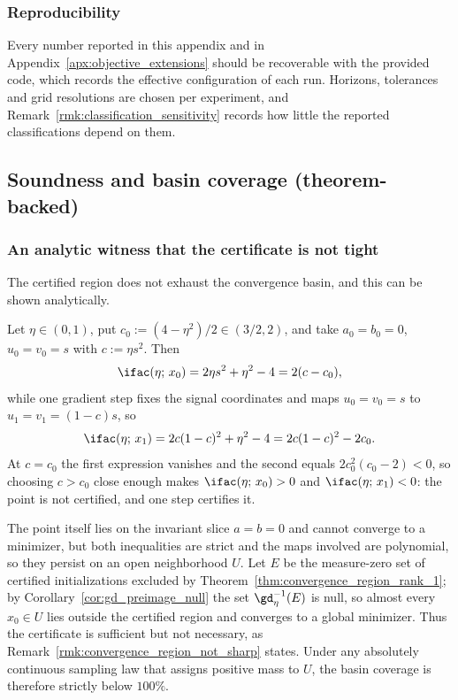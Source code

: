 \documentclass{article}
\begin{document}
\subsubsection{Reproducibility}
\label{apx:sensitivity}

Every number reported in this appendix and in
Appendix~\ref{apx:objective_extensions} should be recoverable with the
provided code, which records the effective configuration of each run.
Horizons, tolerances and grid resolutions are chosen per experiment, and
Remark~\ref{rmk:classification_sensitivity} records how little the reported
classifications depend on them.

\subsection{Soundness and basin coverage (theorem-backed)}
\label{apx:ifac_tightness}

\subsubsection{An analytic witness that the certificate is not tight}
\label{apx:nonsharpness_witness}

The certified region does not exhaust the convergence basin, and this can be
shown analytically.

Let $\eta\in(0,1)$, put $c_0:=(4-\eta^2)/2\in(3/2,2)$, and take $a_0=b_0=0$,
$u_0=v_0=s$ with $c:=\eta s^2$. Then
\begin{align}
    \ifac(\eta;\,x_0) = 2\eta s^2+\eta^2-4 = 2(c-c_0),
\end{align}
while one gradient step fixes the signal coordinates and maps $u_0=v_0=s$ to
$u_1=v_1=(1-c)s$, so
\begin{align}
    \ifac(\eta;\,x_1) = 2c(1-c)^2+\eta^2-4 = 2c(1-c)^2-2c_0 .
\end{align}
At $c=c_0$ the first expression vanishes and the second equals
$2c_0^2(c_0-2)<0$, so choosing $c>c_0$ close enough makes
$\ifac(\eta;\,x_0)>0$ and $\ifac(\eta;\,x_1)<0$: the point is not certified,
and one step certifies it.

The point itself lies on the invariant slice $a=b=0$ and cannot converge to a
minimizer, but both inequalities are strict and the maps involved are
polynomial, so they persist on an open neighborhood $U$. Let $E$ be the
measure-zero set of certified initializations excluded by
Theorem~\ref{thm:convergence_region_rank_1}; by
Corollary~\ref{cor:gd_preimage_null} the set $\gd_\eta^{-1}(E)$ is null, so
almost every $x_0\in U$ lies outside the certified region and converges to a
global minimizer. Thus the certificate is sufficient but not necessary, as
Remark~\ref{rmk:convergence_region_not_sharp} states. Under any absolutely
continuous sampling law that assigns positive mass to $U$, the basin coverage
is therefore strictly below $100\%$.
\end{document}
